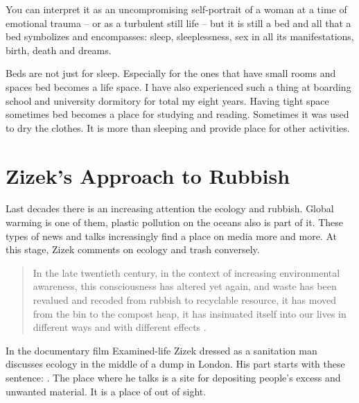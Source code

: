 You can interpret it as an uncompromising self-portrait of a woman at a time of emotional trauma – or as a turbulent still life – but it is still a bed and all that a bed symbolizes and encompasses: sleep, sleeplessness, sex in all its manifestations, birth, death and dreams.

Beds are not just for sleep. Especially for the ones that have small rooms and spaces bed becomes a life space. I have also experienced such a thing at boarding school and university dormitory for total my eight years. Having tight space sometimes bed becomes a place for studying and reading. Sometimes it was used to dry the clothes. It is more than sleeping and provide place for other activities.







%
%
\section{Zizek's Approach to Rubbish}
Last decades there is an increasing attention the ecology and rubbish. Global warming is one of them, plastic pollution on the oceans also is part of it. These types of news and talks increasingly find a place on media more and more. At this stage, Zizek comments on ecology and trash conversely.

\begin{singlespace}
\begin{quote}
In the late twentieth century, in the context of increasing environmental awareness, this consciousness has altered yet again, and waste has been revalued and recoded from rubbish to recyclable resource, it has moved from the bin to the compost heap, it has insinuated itself into our lives in different ways and with different effects \citep[5]{hawkins2005ethics}.
\end{quote}
\end{singlespace}

In the documentary film Examined-life Zizek dressed as a sanitation man discusses ecology in the middle of a dump in London. His part starts with these sentence: . The place where he talks is a site for depositing people's excess and unwanted material. It is a place of out of sight.

